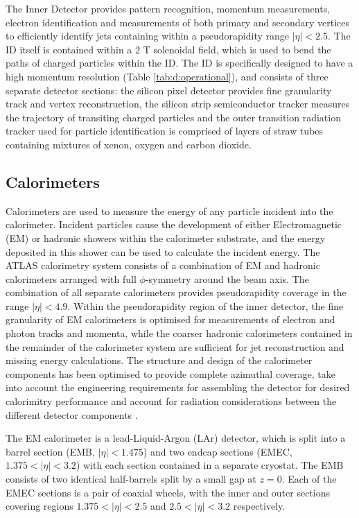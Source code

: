 		The Inner Detector provides pattern recognition, momentum measurements, electron identification and measurements of both primary and secondary vertices to efficiently identify jets containing \bhadron within a pseudorapidity range $|\eta|<2.5$. The ID itself is contained within a 2 T solenoidal field, which is used to bend the paths of charged particles within the ID. The ID is specifically designed to have a high momentum resolution (Table \ref{tab:d:operational}), and consists of three separate detector sections: the silicon pixel detector provides fine granularity track and vertex reconstruction, the silicon strip semiconductor tracker measures the trajectory of transiting charged particles and the outer transition radiation tracker used for particle identification is comprised of layers of straw tubes containing mixtures of xenon, oxygen and carbon dioxide.

	\subsection{Calorimeters}

		Calorimeters are used to measure the energy of any particle incident into the calorimeter. Incident particles cause the development of either Electromagnetic (EM) or hadronic showers within the calorimeter substrate, and the energy deposited in this shower can be used to calculate the incident energy. The ATLAS calorimetry system consists of a combination of EM and hadronic calorimeters arranged with full $\phi$-symmetry around the beam axis. The combination of all separate calorimeters provides pseudorapidity coverage in the range $|\eta| < 4.9$. Within the pseudorapidity region of the inner detector, the fine granularity of EM calorimeters is optimised for measurements of electron and photon tracks and momenta, while the coarser hadronic calorimeters contained in the remainder of the calorimeter system are sufficient for jet reconstruction and missing energy calculations. The structure and design of the calorimeter components has been optimised to provide complete azimuthal coverage, take into account the engineering requirements for assembling the detector for desired calorimitry performance and account for radiation considerations between the different detector components \cite{ATLAS}.

		The EM calorimeter is a lead-Liquid-Argon (LAr) detector, which is split into a barrel section (EMB, $|\eta|<1.475$) and two endcap sections (EMEC, $1.375<|\eta|<3.2$) with each section contained in a separate cryostat. The EMB consists of two identical half-barrels split by a small gap at $z=0$. Each of the EMEC sections is a pair of coaxial wheels, with the inner and outer sections covering regions $1.375<|\eta|<2.5$ and $2.5<|\eta|<3.2$ respectively.


